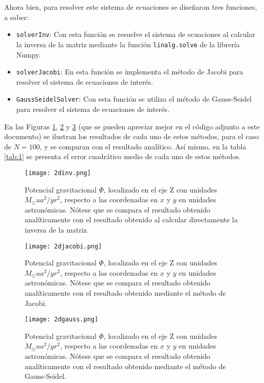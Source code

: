 \documentclass[reprint,amsmath,amssymb,aps]{revtex4-2}
\begin{document}
Ahora bien, para resolver este sistema de ecuaciones se diseñaron tres funciones, a saber:
\begin{itemize}
    \item \texttt{solverInv}: Con esta función se resuelve el sistema de ecuaciones al calcular la inversa de la matriz mediante la función \texttt{linalg.solve} de la librería Numpy.
    \item \texttt{solverJacobi}: En esta función se implementa el método de Jacobi para resolver el sistema de ecuaciones de interés.
    \item \texttt{GaussSeidelSolver}: Con esta función se utiliza el método de Gauss-Seidel para resolver el sistema de ecuaciones de interés.
\end{itemize}
En las Figuras \ref{fig:1}, \ref{fig:2} y \ref{fig:3} (que se pueden apreciar mejor en el código adjunto a este documento) se ilustran los resultados de cada uno de estos métodos, para el caso de $N=100$, y se comparan con el resultado analítico. Así mismo, en la tabla \ref{tab:1} se presenta el error cuadrático medio de cada uno de estos métodos.\\
\begin{figure}
    \centering
    \texttt{[image: 2dinv.png]}
    \caption{Potencial gravitacional $\varPhi$, localizado en el eje Z con unidades $M_{\odot} ua^2/yr^2$, respecto a las coordenadas en $x$ y $y$ en unidades astronómicas. Nótese que se compara el resultado obtenido analíticamente con el resultado obtenido al calcular directamente la inversa de la matriz.}
    \label{fig:1}
\end{figure}
\begin{figure}
    \centering
    \texttt{[image: 2djacobi.png]}
    \caption{Potencial gravitacional $\varPhi$, localizado en el eje Z con unidades $M_{\odot} ua^2/yr^2$, respecto a las coordenadas en $x$ y $y$ en unidades astronómicas. Nótese que se compara el resultado obtenido analíticamente con el resultado obtenido mediante el método de Jacobi.}
    \label{fig:2}
\end{figure}
\begin{figure}
    \centering
    \texttt{[image: 2dgauss.png]}
    \caption{Potencial gravitacional $\varPhi$, localizado en el eje Z con unidades $M_{\odot} ua^2/yr^2$, respecto a las coordenadas en $x$ y $y$ en unidades astronómicas. Nótese que se compara el resultado obtenido analíticamente con el resultado obtenido mediante el método de Gauss-Seidel.}
    \label{fig:3}
\end{figure}
\end{document}
